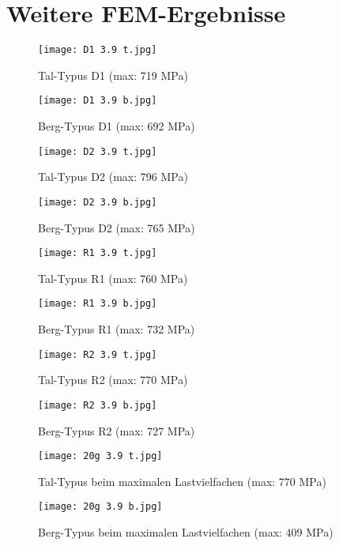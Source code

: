 \chapter{Weitere FEM-Ergebnisse}\label{sec:mehrFEM}
\begin{figure}[h]
	\begin{minipage}[t]{0.5\linewidth}
		\centering
		\texttt{[image: D1 3.9 t.jpg]}
		\caption{Tal-Typus D1 (max: 719 MPa)}
	\end{minipage}
	\hfill
	\begin{minipage}[t]{0.5\linewidth}
		\centering
		\texttt{[image: D1 3.9 b.jpg]}
		\caption{Berg-Typus D1 (max: 692 MPa)}
	\end{minipage}
\end{figure}
\begin{figure}[h]
\begin{minipage}[t]{0.5\linewidth}
	\centering
	\texttt{[image: D2 3.9 t.jpg]}
	\caption{Tal-Typus D2 (max: 796 MPa)}
\end{minipage}
\hfill
\begin{minipage}[t]{0.5\linewidth}
	\centering
	\texttt{[image: D2 3.9 b.jpg]}
	\caption{Berg-Typus D2 (max: 765 MPa)}
\end{minipage}
\end{figure}
\begin{figure}[h]
\begin{minipage}[t]{0.5\linewidth}
	\centering
	\texttt{[image: R1 3.9 t.jpg]}
	\caption{Tal-Typus R1 (max: 760 MPa)}
\end{minipage}
\hfill
\begin{minipage}[t]{0.5\linewidth}
	\centering
	\texttt{[image: R1 3.9 b.jpg]}
	\caption{Berg-Typus R1 (max: 732 MPa)}
\end{minipage}
\end{figure}
%
%
\begin{figure}[h]
\begin{minipage}[t]{0.5\linewidth}
	\centering
	\texttt{[image: R2 3.9 t.jpg]}
	\caption{Tal-Typus R2 (max: 770 MPa)}
\end{minipage}
\hfill
\begin{minipage}[t]{0.5\linewidth}
	\centering
	\texttt{[image: R2 3.9 b.jpg]}
	\caption{Berg-Typus R2 (max: 727 MPa)}
\end{minipage}
\end{figure}
\begin{figure}[h]
\begin{minipage}[t]{0.5\linewidth}
	\centering
	\texttt{[image: 20g 3.9 t.jpg]}
	\caption{Tal-Typus beim maximalen Lastvielfachen (max: 770 MPa)}
\end{minipage}
\hfill
\begin{minipage}[t]{0.5\linewidth}
	\centering
	\texttt{[image: 20g 3.9 b.jpg]}
	\caption{Berg-Typus beim maximalen Lastvielfachen (max: 409 MPa)}
\end{minipage}
\end{figure}
